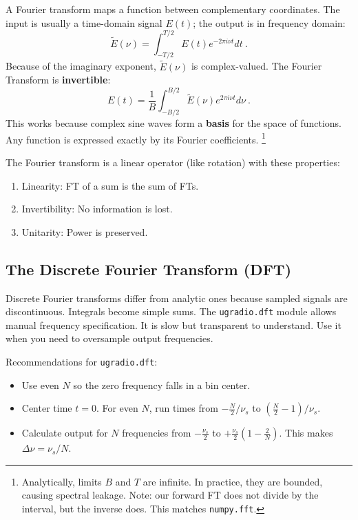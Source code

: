 \documentclass[11pt,preprint]{aastex}
\begin{document}
\noindent
A Fourier transform maps a function between complementary coordinates.
The input is usually a time-domain signal $E(t)$; the output is in frequency domain:
%
\begin{equation}
\tilde E(\nu) = \int_{-T/2}^{T/2} E(t) e^{-2 \pi i \nu t} dt \ .
\label{eq:dft}
\end{equation}
%
\noindent
Because of the imaginary exponent, $\tilde E(\nu)$ is complex-valued.
The Fourier Transform is {\bf invertible}:
%
\begin{equation}
E(t) = \frac1{B} \int_{-B/2}^{B/2} \tilde E(\nu) e^{2 \pi i \nu t} d\nu \ .
\end{equation}
%
This works because complex sine waves form a {\bf basis} for the space of functions.
Any function is expressed exactly by its Fourier coefficients.%
\footnote{Analytically, limits $B$ and $T$ are infinite.
In practice, they are bounded, causing spectral leakage.
Note: our forward FT does not divide by the interval, but the inverse does.
This matches {\tt numpy.fft}.}


The Fourier transform is a linear operator (like rotation) with these properties:
\begin{enumerate}
\item Linearity: FT of a sum is the sum of FTs.
\item Invertibility: No information is lost.
\item Unitarity: Power is preserved.
\end{enumerate}


\subsection{The Discrete Fourier Transform (DFT)}
\label{dft}

\noindent
Discrete Fourier transforms differ from analytic ones because sampled signals
are discontinuous.
Integrals become simple sums.
The \verb$ugradio.dft$ module allows manual frequency specification.
It is slow but transparent to understand.
Use it when you need to oversample output frequencies.

Recommendations for \verb$ugradio.dft$:
\begin{itemize}
\item Use even $N$ so the zero frequency falls in a bin center.

\item Center time $t=0$.
For even $N$, run times from $-\frac{N}{2}/ \nu_s$ to $(\frac{N}{2} -1)/ \nu_s$.

\item Calculate output for $N$ frequencies from $-\frac{\nu_s}{2}$ to
$+\frac{\nu_s}{2}\left(1 - \frac{2}{N} \right)$.
This makes $\Delta \nu = \nu_s/N$.
\end{itemize}
\end{document}
